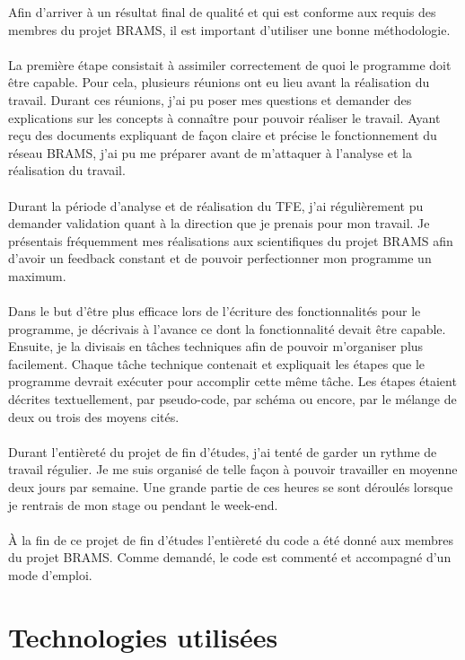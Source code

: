 \documentclass[11pt]{article}
\begin{document}
Afin d'arriver à un résultat final de qualité et qui est conforme aux requis des membres du projet BRAMS, il est important d'utiliser une bonne méthodologie.\\
\\
La première étape consistait à assimiler correctement de quoi le programme doit être capable.
Pour cela, plusieurs réunions ont eu lieu avant la réalisation du travail.
Durant ces réunions, j'ai pu poser mes questions et demander des explications sur les concepts à connaître pour pouvoir réaliser le travail.
Ayant reçu des documents expliquant de façon claire et précise le fonctionnement du réseau BRAMS, j'ai pu me préparer avant de m'attaquer à l'analyse et la réalisation du travail.\\
\\
Durant la période d'analyse et de réalisation du TFE, j'ai régulièrement pu demander validation quant à la direction que je prenais pour mon travail.
Je présentais fréquemment mes réalisations aux scientifiques du projet BRAMS afin d'avoir un feedback constant et de pouvoir perfectionner mon programme un maximum.\\
\\
Dans le but d'être plus efficace lors de l'écriture des fonctionnalités pour le programme, je décrivais à l'avance ce dont la fonctionnalité devait être capable.
Ensuite, je la divisais en tâches techniques afin de pouvoir m'organiser plus facilement.
Chaque tâche technique contenait et expliquait les étapes que le programme devrait exécuter pour accomplir cette même tâche.
Les étapes étaient décrites textuellement, par pseudo-code, par schéma ou encore, par le mélange de deux ou trois des moyens cités.\\
\\
Durant l'entièreté du projet de fin d'études, j'ai tenté de garder un rythme de travail régulier.
Je me suis organisé de telle façon à pouvoir travailler en moyenne deux jours par semaine.
Une grande partie de ces heures se sont déroulés lorsque je rentrais de mon stage ou pendant le week-end.\\
\\
À la fin de ce projet de fin d'études l'entièreté du code a été donné aux membres du projet BRAMS.
Comme demandé, le code est commenté et accompagné d'un mode d'emploi.

\newpage

\section{Technologies utilisées}
\end{document}
